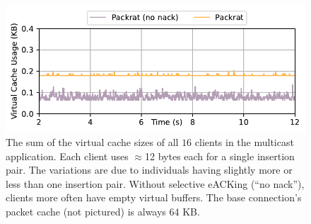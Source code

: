 \begin{figure}[t]
    \centering
    \includegraphics[width=0.8\linewidth]{packrat-paper/figures/cache_multicast.pdf}
    \caption{The sum of the virtual cache sizes of all $16$ clients in
     the multicast application. Each client uses $\approx\!$12 bytes each for a
     single insertion pair. The variations are due to individuals having
     slightly more or less than one insertion pair. Without selective eACKing
     (``no nack''), clients more often have empty virtual buffers. The base
     connection's packet cache (not pictured) is always 64 KB.}
    \label{fig:memory:multicast}
\end{figure}
